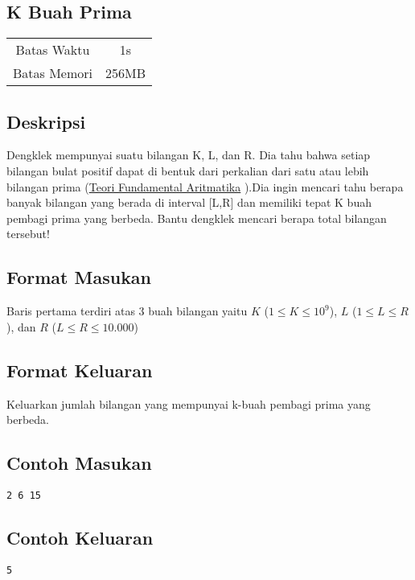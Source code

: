 \documentclass{article}
\begin{document}
\begin{center}

    
    \section*{K Buah Prima} %

    \begin{tabular}{ | c c | }
        \hline
        Batas Waktu  & 1s \\    %
        Batas Memori & 256MB \\  %
        \hline
    \end{tabular}
\end{center}

\subsection*{Deskripsi}
Dengklek mempunyai suatu bilangan K, L, dan R. Dia tahu bahwa setiap bilangan bulat positif dapat di bentuk dari perkalian dari satu atau lebih bilangan prima (\href{https://mathworld.wolfram.com/FundamentalTheoremofArithmetic.html}{Teori Fundamental Aritmatika} ).Dia ingin mencari tahu berapa banyak bilangan yang berada di interval [L,R] dan memiliki tepat K buah pembagi prima yang berbeda. Bantu dengklek mencari berapa total bilangan tersebut!

\subsection*{Format Masukan}

Baris pertama terdiri atas 3 buah bilangan yaitu $K$ ($1 \leq K \leq 10^9$), $L$ ($1 \leq L \leq R$), dan $R$ ($L \leq R \leq 10.000$)

\subsection*{Format Keluaran}

Keluarkan jumlah bilangan yang mempunyai k-buah pembagi prima yang berbeda.
\\

\begin{multicols}{2}
\subsection*{Contoh Masukan}
\begin{lstlisting}
2 6 15
\end{lstlisting}
\columnbreak
\subsection*{Contoh Keluaran}
\begin{lstlisting}
5
\end{lstlisting}
\vfill
\null
\end{multicols}
\end{document}
